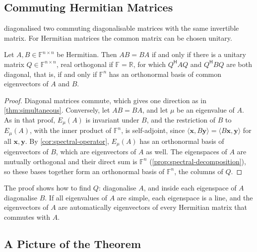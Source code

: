\subsection{Commuting Hermitian Matrices}

 diagonalised two commuting diagonalisable matrices with the same invertible matrix. For Hermitian matrices the common matrix can be chosen unitary.

\begin{theorem}
\label{thm:simultaneous-unitary}
Let $A,B\in\mathbb F^{n\times n}$ be Hermitian. Then $AB=BA$ if and only if there is a unitary matrix $Q\in\mathbb F^{n\times n}$, real orthogonal if $\mathbb F=\mathbb R$, for which $Q^{\mathsf H}AQ$ and $Q^{\mathsf H}BQ$ are both diagonal, that is, if and only if $\mathbb F^n$ has an orthonormal basis of common eigenvectors of $A$ and $B$.
\end{theorem}

\begin{proof}
Diagonal matrices commute, which gives one direction as in \cref{thm:simultaneous}. Conversely, let $AB=BA$, and let $\mu$ be an eigenvalue of $A$. As in that proof, $E_\mu(A)$ is invariant under $B$, and the restriction of $B$ to $E_\mu(A)$, with the inner product of $\mathbb F^n$, is self-adjoint, since $\langle\mathbf x,B\mathbf y\rangle=\langle B\mathbf x,\mathbf y\rangle$ for all $\mathbf x,\mathbf y$. By \cref{cor:spectral-operator}, $E_\mu(A)$ has an orthonormal basis of eigenvectors of $B$, which are eigenvectors of $A$ as well. The eigenspaces of $A$ are mutually orthogonal and their direct sum is $\mathbb F^n$ (\cref{prop:spectral-decomposition}), so these bases together form an orthonormal basis of $\mathbb F^n$, the columns of $Q$.
\end{proof}

The proof shows how to find $Q$: diagonalise $A$, and inside each eigenspace of $A$ diagonalise $B$. If all eigenvalues of $A$ are simple, each eigenspace is a line, and the eigenvectors of $A$ are automatically eigenvectors of every Hermitian matrix that commutes with $A$.

\subsection{A Picture of the Theorem}

